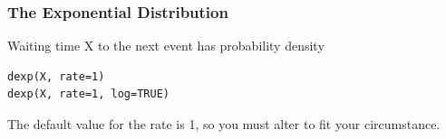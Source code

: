 \documentclass[MAIN.tex]{subfiles}
\begin{document}
\begin{frame}[fragile]
	\frametitle{The Exponential Distribution}
	\large

Waiting time X to the next event has probability density

\begin{framed}
\begin{verbatim}
dexp(X, rate=1)
dexp(X, rate=1, log=TRUE)
\end{verbatim}
\end{framed}
The default value for the rate is 1, so you must alter to fit your circumstance.

\end{frame}

%
%
%
%
%
\end{document}
